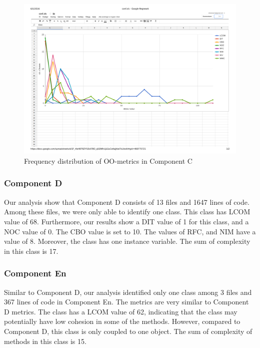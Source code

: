 \begin{landscape}
\setlength\LTleft{-.5in}
	\begin{figure}
	\centering
	\includegraphics[width=\textwidth]{images/pdf/conf.pdf}
	\caption{Frequency distribution of OO-metrics in Component C}
	\label{fig:confgraph}
	\end{figure}
\end{landscape}


\subsubsection{Component D}
Our analysis show that Component D consists of 13 files and 1647 lines of code. Among these files, we were only able to identify one class. This class has LCOM value of 68. Furthermore, our results show a DIT value of 1 for this class, and a NOC value of 0. The CBO value is set to 10. The values of RFC, and NIM have a value of 8. Moreover, the class has one instance variable. The sum of complexity in this class is 17.

\subsubsection{Component En}
Similar to Component D, our analysis identified only one class among 3 files and 367 lines of code in Component En. The metrics are very similar to Component D metrics. The class has a LCOM value of 62, indicating that the class may potentially have low cohesion in some of the methods. However, compared to Component D, this class is only coupled to one object. The sum of complexity of methods in this class is 15.

